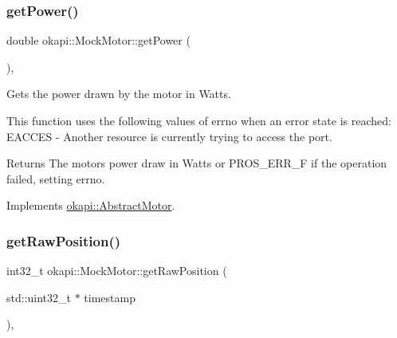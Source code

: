 \mbox{\label{classokapi_1_1MockMotor_a64fc89d3dceff059614ea85c62d14a04}} 
\subsubsection{\texorpdfstring{getPower()}{getPower()}}
{\footnotesize\ttfamily double okapi\+::\+Mock\+Motor\+::get\+Power (\begin{DoxyParamCaption}{ }\end{DoxyParamCaption})\hspace{0.3cm}{\ttfamily [override]}, {\ttfamily [virtual]}}



Gets the power drawn by the motor in Watts. 

This function uses the following values of errno when an error state is reached\+: E\+A\+C\+C\+ES -\/ Another resource is currently trying to access the port.

\begin{DoxyReturn}{Returns}
The motor\textquotesingle{}s power draw in Watts or P\+R\+O\+S\+\_\+\+E\+R\+R\+\_\+F if the operation failed, setting errno. 
\end{DoxyReturn}


Implements \mbox{\hyperlink{classokapi_1_1AbstractMotor_aed423ac40cec85c5880f7954b6d810fe}{okapi\+::\+Abstract\+Motor}}.

\mbox{\label{classokapi_1_1MockMotor_a218029c713cc871b010798dd0fa799a9}} 
\subsubsection{\texorpdfstring{getRawPosition()}{getRawPosition()}}
{\footnotesize\ttfamily int32\+\_\+t okapi\+::\+Mock\+Motor\+::get\+Raw\+Position (\begin{DoxyParamCaption}\item[{std\+::uint32\+\_\+t $\ast$}]{timestamp }\end{DoxyParamCaption})\hspace{0.3cm}{\ttfamily [override]}, {\ttfamily [virtual]}}




